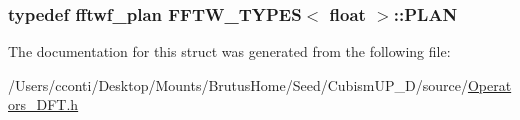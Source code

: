 \subsubsection[{P\+L\+A\+N}]{\setlength{\rightskip}{0pt plus 5cm}typedef fftwf\+\_\+plan {\bf F\+F\+T\+W\+\_\+\+T\+Y\+P\+E\+S}$<$ float $>$\+::{\bf P\+L\+A\+N}}\label{struct_f_f_t_w___t_y_p_e_s_3_01float_01_4_a564fe6a699a8574500c81d7d43b23980}


The documentation for this struct was generated from the following file\+:\begin{DoxyCompactItemize}
\item 
/\+Users/cconti/\+Desktop/\+Mounts/\+Brutus\+Home/\+Seed/\+Cubism\+U\+P\+\_\+D/source/\hyperlink{_operators___d_f_t_8h}{Operators\+\_\+\+D\+F\+T.\+h}\end{DoxyCompactItemize}
